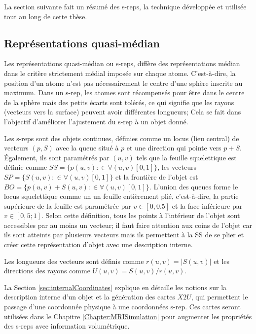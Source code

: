 La section suivante fait un résumé des s-reps, la technique développée et utilisée tout au long de cette thèse.

\subsection{Représentations quasi-médian}

Les représentations quasi-médian \cite{pizer_nested_2012} ou s-reps, 
diffère des représentations médian dans le critère strictement médial imposée sur chaque atome. 
C'est-à-dire, la position d'un atome n'est pas nécessairement le centre
d'une sphère inscrite au maximum.
Dans un s-rep, les atomes sont récompensés pour être dans le centre de la sphère mais des petits
écarts sont tolérés, ce qui signifie que les rayons (vecteurs vers la surface) peuvent avoir différentes longueurs;
Cela se fait dans l'objectif d'améliorer l'ajustement du s-rep à un objet donné.

Les s-reps sont des objets continues, définies comme un locus (lieu central) de vecteurs $(p, S)$
avec la queue situé à $p$ et une direction qui pointe vers $p + S$. 
Également, ils sont paramétrés par $(u, v)$ tels que
la feuille squelettique est définie comme $SS = \{p (u, v): \in \forall (u, v) [0, 1] \} $, les
vecteurs $SP = \{S (u, v): \in \forall (u, v) [0, 1] \} $ et
la frontière de l'objet est $BO = \{p (u, v) + S (u, v): \in \forall (u, v) [0, 1] \} $.
L'union des queues forme le locus squelettique comme un 
un feuille entièrement plié, c'est-à-dire, la partie supérieure de la feuille est paramétrée par $v \in [0, 0.5] $
et la face inférieure par $v \in [0,5; 1]$.
Selon cette définition, tous les points à l'intérieur de l'objet sont accessibles par au moins un vecteur;
il faut faire attention aux coins de l'objet car ils sont atteints par plusieurs vecteurs mais ils permettent 
à la SS de se plier et créer cette représentation d'objet avec une description interne.

Les longueurs des vecteurs sont définis comme $r (u, v) = |S (u, v) | $ et
les directions des rayons comme $U (u, v) = S (u, v) / r (u, v) $.

La Section \ref{sec:internalCoordinates} explique en détaille les notions sur la description interne d'un objet
et la génération des cartes $X2U$, qui permettent le passage d'une coordonnée physique à une coordonnées s-rep.
Ces cartes seront utilisées dans le Chapitre \ref{Chapter:MRISimulation} pour augmenter 
les propriétés des s-reps avec information volumétrique.

